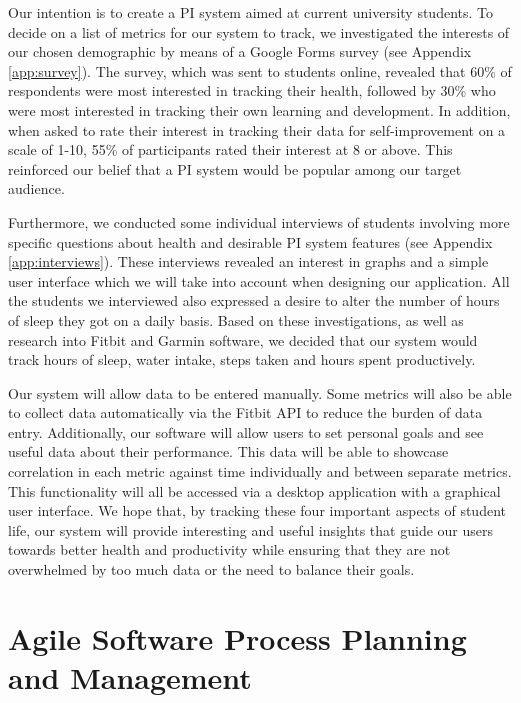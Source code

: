\documentclass[11pt]{article}
\begin{document}
Our intention is to create a PI system aimed at current university students. To
decide on a list of metrics for our system to track, we investigated the
interests of our chosen demographic by means of a Google Forms survey (see
Appendix \ref{app:survey}). The survey, which was sent to students online,
revealed that 60\% of respondents were most interested in tracking their
health, followed by 30\% who were most interested in tracking their own
learning and development. In addition, when asked to rate their interest in
tracking their data for self-improvement on a scale of 1-10, 55\% of
participants rated their interest at 8 or above. This reinforced our belief
that a PI system would be popular among our target audience. 

\newpage

Furthermore, we conducted some individual interviews of students involving more
specific questions about health and desirable PI system features (see Appendix
\ref{app:interviews}). These interviews revealed an interest in graphs and a
simple user interface which we will take into account when designing our
application. All the students we interviewed also expressed a desire to alter
the number of hours of sleep they got on a daily basis. Based on these
investigations, as well as research into Fitbit and Garmin software, we decided
that our system would track hours of sleep, water intake, steps taken and hours
spent productively.\par

Our system will allow data to be entered manually. Some metrics will also be
able to collect data automatically via the Fitbit API to reduce the burden of
data entry. Additionally, our software will allow users to set personal goals
and see useful data about their performance. This data will be able to showcase
correlation in each metric against time individually and between separate
metrics. This functionality will all be accessed via a desktop application with
a graphical user interface. We hope that, by tracking these four important
aspects of student life, our system will provide interesting and useful
insights that guide our users towards better health and productivity while
ensuring that they are not overwhelmed by too much data or the need to balance
their goals.


\section{Agile Software Process Planning and Management}
\end{document}
